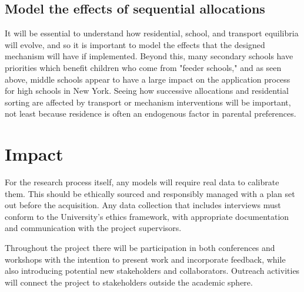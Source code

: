 \documentclass{article}
\begin{document}
\begin{multicols}{2}
\subsection{Model the effects of sequential allocations}
It will be essential to understand how residential, school, and transport equilibria will evolve, and so it is important to model the effects that the designed mechanism will have if implemented. Beyond this, many secondary schools have priorities which benefit children who come from "feeder schools," and as seen above, middle schools appear to have a large impact on the application process for high schools in New York. Seeing how successive allocations and residential sorting are affected by transport or mechanism interventions will be important, not least because residence is often an endogenous factor in parental preferences.


\section{Impact}
For the research process itself, any models will require real data to calibrate them. This should be ethically sourced and responsibly managed with a plan set out before the acquisition. Any data collection that includes interviews must conform to the University's ethics framework, with appropriate documentation and communication with the project supervisors.

Throughout the project there will be participation in both conferences and workshops with the intention to present work and incorporate feedback, while also introducing potential new stakeholders and collaborators. Outreach activities will connect the project to stakeholders outside the academic sphere.


\end{multicols}
\end{document}

